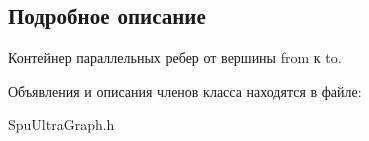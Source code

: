 \subsection{Подробное описание}
Контейнер параллельных ребер от вершины from к to. 

Объявления и описания членов класса находятся в файле\+:\begin{DoxyCompactItemize}
\item 
Spu\+Ultra\+Graph.\+h\end{DoxyCompactItemize}
